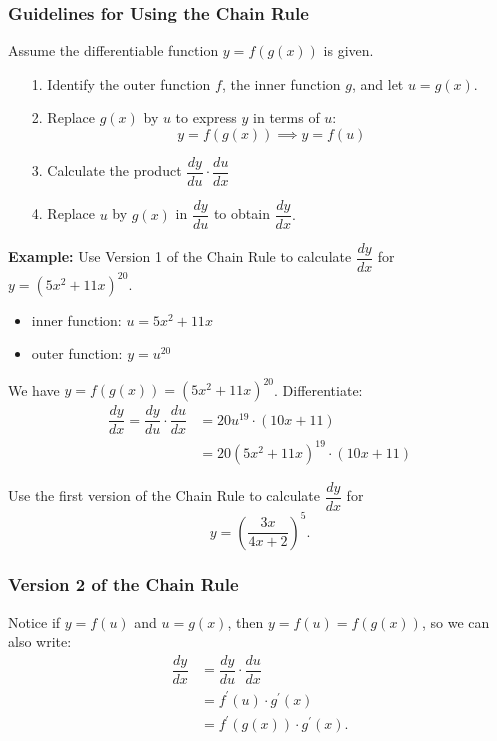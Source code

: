 \documentclass[14pt]{beamer}
\begin{document}
\begin{frame}
\frametitle{Guidelines for Using the Chain Rule}
\small
Assume the differentiable function $y=f(g(x))$ is given.
\begin{itemize}
\item[1.] Identify the outer function $f$, the inner function $g$, and let $u=g(x).$
\item[2.] Replace $g(x)$ by $u$ to express $y$ in terms of $u$:
$$y=f(g(x)) \implies y=f(u)$$
\item[3.]  Calculate the product $\dfrac{dy}{du} \cdot \dfrac{du}{dx}$
\item[4.] Replace $u$ by $g(x)$ in $\dfrac{dy}{du}$ to obtain $\dfrac{dy}{dx}.$
\end{itemize}
\end{frame}

\begin{frame}
\footnotesize
{\bf Example:} Use Version 1 of the Chain Rule to calculate $\dfrac{dy}{dx}$ for $y=(5x^2 +11x)^{20}$.

\begin{itemize}
\item inner function: $u=5x^2+11x$ 
\item outer function: $y=u^{20}$
\end{itemize}

\vspace{1pc}
We have $y = f(g(x)) = (5x^2 +11x)^{20}$.  Differentiate:
\begin{align*} 
\dfrac{dy}{dx}= \dfrac{dy}{du}\cdot\dfrac{du}{dx} &= 20u^{19} \cdot (10x+11) \\
 &=20(5x^2 +11x)^{19} \cdot (10x+11)
\end{align*}
\end{frame}

\begin{frame}%
Use the first version of the Chain Rule to calculate $\dfrac{dy}{dx}$ for $$y=\left( \dfrac{3x}{4x+2} \right)^5.$$
\end{frame}

\begin{frame}
\frametitle{Version 2 of the Chain Rule}
\small
Notice if $y=f(u)$ and $u=g(x)$, then $y=f(u)=f(g(x))$, so we can also write:
\begin{align*}
\dfrac{dy}{dx} &= \dfrac{dy}{du} \cdot \dfrac{du}{dx} \\[0.75pc]
 &= f^{\prime}(u) \cdot g^{\prime}(x) \\[0.75pc]
 &= f^{\prime}(g(x)) \cdot g^{\prime}(x).
\end{align*}
\end{frame}
\end{document}
